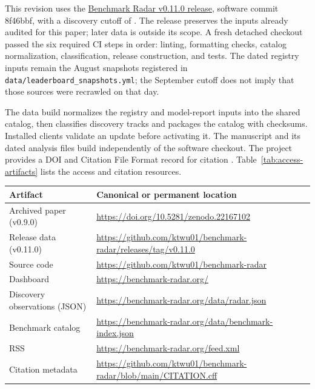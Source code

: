 \documentclass[11pt]{article}
\newcommand{\datacutoff}{\ReportDataCutoff}
\newcommand{\gitcommit}{8f46bbf}
\begin{document}
This revision uses the \href{https://github.com/ktwu01/benchmark-radar/releases/tag/v0.11.0}{Benchmark Radar v0.11.0 release}, software commit \gitcommit{}, with a discovery cutoff of \datacutoff{}. The release preserves the inputs already audited for this paper; later data is outside its scope. A fresh detached checkout passed the six required CI steps in order: linting, formatting checks, catalog normalization, classification, release construction, and tests. The dated registry inputs remain the August snapshots registered in \texttt{data/leaderboard\_snapshots.yml}; the September cutoff does not imply that those sources were recrawled on that day.

The data build normalizes the registry and model-report inputs into the shared catalog, then classifies discovery tracks and packages the catalog with checksums. Installed clients validate an update before activating it. The manuscript and its dated analysis files build independently of the software checkout. The project provides a DOI and Citation File Format record for citation \citep{smith2016,katz2021,cff,benchmark-radar}. Table~\ref{tab:access-artifacts} lists the access and citation resources.

\begin{center}
\centering
\small
\begin{tabularx}{\textwidth}{L{0.28\textwidth}Y}
\toprule
\textbf{Artifact} & \textbf{Canonical or permanent location}\\
\midrule
Archived paper (v0.9.0) & \url{https://doi.org/10.5281/zenodo.22167102}\\
Release data (v0.11.0) & \url{https://github.com/ktwu01/benchmark-radar/releases/tag/v0.11.0}\\
Source code & \url{https://github.com/ktwu01/benchmark-radar}\\
Dashboard & \url{https://benchmark-radar.org/}\\
Discovery observations (JSON) & \url{https://benchmark-radar.org/data/radar.json}\\
Benchmark catalog & \url{https://benchmark-radar.org/data/benchmark-index.json}\\
RSS & \url{https://benchmark-radar.org/feed.xml}\\
Citation metadata & \url{https://github.com/ktwu01/benchmark-radar/blob/main/CITATION.cff}\\
\bottomrule
\end{tabularx}
\label{tab:access-artifacts}
\end{center}
\end{document}
